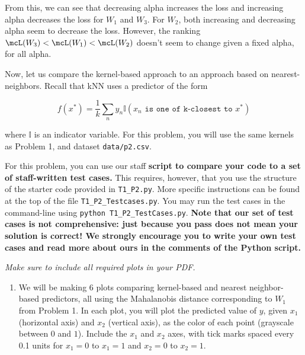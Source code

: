 \documentclass[submit]{harvardml}
\begin{document}
\begin{enumerate}
    From this, we can see that decreasing alpha increases the loss and increasing alpha decreases the loss for $W_1$ and $W_3$. For $W_2$, both increasing and decreasing alpha seem to decrease the loss. However, the ranking $\mcL(W_3) < \mcL(W_1) < \mcL(W_2)$ doesn't seem to change given a fixed alpha, for all alpha.
\end{enumerate}

\newpage



\begin{problem}

Now, let us compare the kernel-based approach to an approach based on
nearest-neighbors.  Recall that kNN uses a predictor of the form

  \begin{equation*}
    f(x^*) = \frac{1}{k} \sum_n y_n \mathbb{I}(x_n \texttt{ is one of k-closest to } x^*)
  \end{equation*}

\noindent where $\mathbb{I}$ is an indicator variable. For this problem, you will use the same kernels as Problem 1, and dataset \verb|data/p2.csv|.

For this problem, you can use our staff \textbf{script to compare your code to a set of staff-written test cases.} This requires, however, that you use the structure of the starter code provided in \texttt{T1\_P2.py}. More specific instructions can be found at the top of the file \texttt{T1\_P2\_Testcases.py}. You may run the test cases in the command-line using \texttt{python T1\_P2\_TestCases.py}.
\textbf{Note that our set of test cases is not comprehensive: just because you pass does not mean your solution is correct! We strongly encourage you to write your own test cases and read more about ours in the comments of the Python script.}

\vspace{0.5cm}
\noindent\emph{Make sure to include all required plots in your PDF.}


\begin{enumerate}

\item We will be making 6 plots comparing kernel-based and nearest
  neighbor-based predictors, all using the Mahalanobis distance
  corresponding to $W_1$ from Problem 1. In each plot, you will plot
  the predicted value of $y$, given $x_1$ (horizontal axis) and $x_2$
  (vertical axis), as the color of each point (grayscale
  between $0$ and $1$). Include the $x_1$ and $x_2$ axes, with tick marks spaced every 0.1 units
  for $x_1=0$ to $x_1=1$ and $x_2=0$ to $x_2=1$.


\end{enumerate}
\end{problem}
\end{document}
